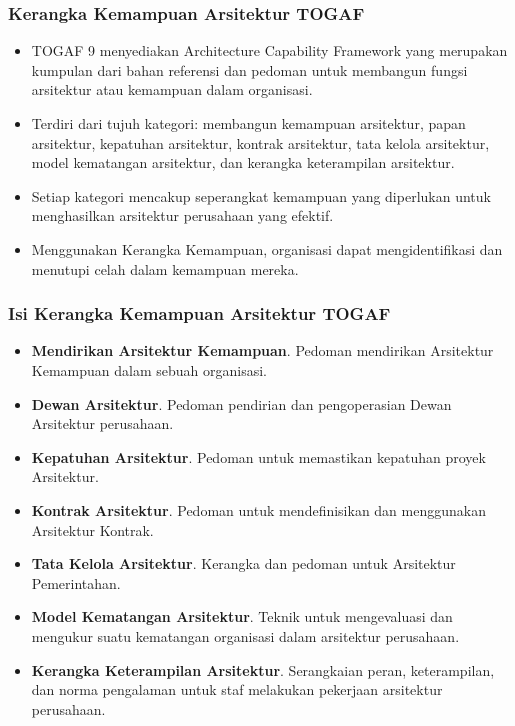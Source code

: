 \documentclass[aspectratio=169]{beamer}
\begin{document}
	\begin{frame}
		\frametitle{Kerangka Kemampuan Arsitektur TOGAF}
		\begin{itemize}
			\item TOGAF 9 menyediakan Architecture Capability Framework yang merupakan kumpulan dari bahan referensi dan pedoman untuk membangun fungsi arsitektur
			atau kemampuan dalam organisasi.
			\item Terdiri dari tujuh kategori: membangun kemampuan arsitektur, papan arsitektur, kepatuhan arsitektur, kontrak arsitektur, tata kelola arsitektur, model kematangan arsitektur, dan kerangka keterampilan arsitektur.
			\item Setiap kategori mencakup seperangkat kemampuan yang diperlukan untuk menghasilkan arsitektur perusahaan yang efektif.
			\item Menggunakan Kerangka Kemampuan, organisasi dapat mengidentifikasi dan menutupi celah dalam kemampuan mereka.
		\end{itemize}
	\end{frame}
	
	\begin{frame}
		\frametitle{Isi Kerangka Kemampuan Arsitektur TOGAF}
		\begin{itemize}
			\item \textbf{Mendirikan Arsitektur Kemampuan}. Pedoman mendirikan Arsitektur Kemampuan
			dalam sebuah organisasi.
			\item \textbf{Dewan Arsitektur}. Pedoman pendirian dan pengoperasian Dewan Arsitektur perusahaan.
			\item \textbf{Kepatuhan Arsitektur}. Pedoman untuk memastikan kepatuhan proyek Arsitektur.
			\item \textbf{Kontrak Arsitektur}. Pedoman untuk mendefinisikan dan menggunakan Arsitektur Kontrak.
			\item \textbf{Tata Kelola Arsitektur}. Kerangka dan pedoman untuk Arsitektur Pemerintahan.
			\item \textbf{Model Kematangan Arsitektur}. Teknik untuk mengevaluasi dan mengukur suatu kematangan organisasi dalam arsitektur perusahaan.
			\item \textbf{Kerangka Keterampilan Arsitektur}. Serangkaian peran, keterampilan, dan norma pengalaman untuk staf melakukan pekerjaan arsitektur perusahaan.
		\end{itemize}
	\end{frame}
	
\end{document}

